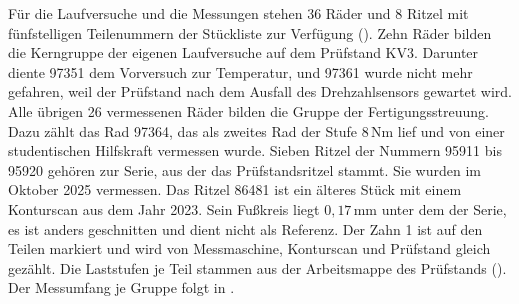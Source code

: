 

Für die Laufversuche und die Messungen stehen 36 Räder und 8 Ritzel mit fünfstelligen Teilenummern der Stückliste zur Verfügung (). Zehn Räder bilden die Kerngruppe der eigenen Laufversuche auf dem Prüfstand KV3. Darunter diente 97351 dem Vorversuch zur Temperatur, und 97361 wurde nicht mehr gefahren, weil der Prüfstand nach dem Ausfall des Drehzahlsensors gewartet wird. Alle übrigen 26 vermessenen Räder bilden die Gruppe der Fertigungsstreuung. Dazu zählt das Rad 97364, das als zweites Rad der Stufe $8$\,Nm lief und von einer studentischen Hilfskraft vermessen wurde. Sieben Ritzel der Nummern 95911 bis 95920 gehören zur Serie, aus der das Prüfstandsritzel stammt. Sie wurden im Oktober 2025 vermessen. Das Ritzel 86481 ist ein älteres Stück mit einem Konturscan aus dem Jahr 2023. Sein Fußkreis liegt $0{,}17$\,mm unter dem der Serie, es ist anders geschnitten und dient nicht als Referenz. Der Zahn 1 ist auf den Teilen markiert und wird von Messmaschine, Konturscan und Prüfstand gleich gezählt. Die Laststufen je Teil stammen aus der Arbeitsmappe des Prüfstands (). Der Messumfang je Gruppe folgt in .


